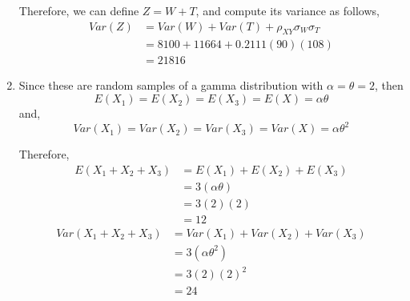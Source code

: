 \documentclass{article}
\begin{document}
\begin{enumerate}
      Therefore, we can define $Z = W+T$, and compute its variance as follows,
      \begin{align*}
       Var(Z) &= Var(W) + Var(T) + \rho_{XY} \sigma_W \sigma_T \\
	&= 8100 + 11664 + 0.2111(90)(108) \\
	&= 21816
      \end{align*}
     
     \item
      Since these are random samples of a gamma distribution with $\alpha = \theta = 2$, then
      $$E(X_1) = E(X_2) = E(X_3) = E(X) = \alpha \theta$$
      and,
      $$Var(X_1) = Var(X_2) = Var(X_3) = Var(X) = \alpha \theta^2$$
      
      Therefore,
      \begin{align*}
	E(X_1+X_2+X_3) &= E(X_1) + E(X_2) + E(X_3) \\
	  &= 3(\alpha \theta) \\
	  &= 3(2)(2) \\
	  &= 12
      \end{align*}
      \begin{align*}
       Var(X_1 + X_2 + X_3) &= Var(X_1) + Var(X_2) + Var(X_3) \\
	&= 3(\alpha \theta^2) \\
	&= 3(2)(2)^2 \\
	&= 24
      \end{align*}
    \end{enumerate}
    
\end{document}
